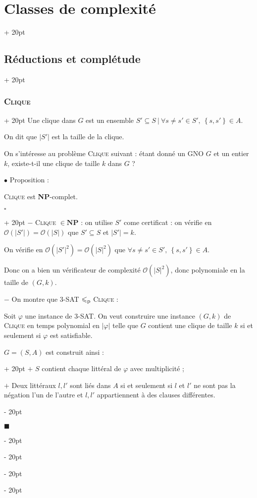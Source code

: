 \documentclass[a4paper, 12pt, twoside]{article}
\newcommand{\lr}[1]{\left( #1 \right)}
\newcommand{\set}[1]{\left\{ #1 \right\}}
\newcommand{\abs}[1]{\left\lvert #1 \right\rvert}
\renewcommand{\le}{\leqslant}
\newcommand{\ind}[1][20pt]{\advance\leftskip + #1}
\newcommand{\deind}[1][20pt]{\advance\leftskip - #1}
\newenvironment{indt}[2][20pt]{#2 \par \ind[#1]}{\par \deind} %
\newenvironment{proof}[1][{}]{\begin{indt}{$\square$ #1}}{$\blacksquare$ \end{indt}}
\begin{document}
\begin{indt}{\section{Classes de complexité}}
\begin{indt}{\subsection{Réductions et complétude}}
\begin{indt}{\subsubsection{\textsc{Clique}}}
                Une clique dans $G$ est un ensemble $S' \subseteq S\ |\ \forall s \neq s' \in S',\ \set{s, s'} \in A$.

                On dit que $\abs{S'}$ est la taille de la clique.

                \vspace{6pt}
                
                On s'intéresse au problème \textsc{Clique} suivant : étant donné un GNO $G$ et un entier $k$, existe-t-il une clique de taille $k$ dans $G$ ?

                \vspace{12pt}
                
                $\bullet$ Proposition :
                \begin{emphBox}
                    \textsc{Clique} est \textbf{NP}-complet.
                \end{emphBox}

                \vspace{6pt}
                
                \begin{proof}
                    $-$ \textsc{Clique} $\in \mathbf{NP}$ : on utilise $S'$ come certificat : on vérifie en $\mathcal O(\abs{S'}) = \mathcal O(\abs S)$ que $S' \subseteq S$ et $\abs{S'} = k$.

                    On vérifie en $\mathcal O\!\lr{\abs{S'}^2} = \mathcal O\!\lr{\abs S ^2}$ que $\forall s \neq s' \in S',\ \set{s, s'} \in A$.

                    Donc on a bien un vérificateur de complexité $\mathcal O\!\lr{\abs S ^2}$, donc polynomiale en la taille de $(G, k)$.

                    \vspace{6pt}
                    
                    $-$ On montre que $3$-SAT $\le_{\rm p}$ \textsc{Clique} :

                    Soit $\varphi$ une instance de 3-SAT. On veut construire une instance $(G, k)$ de \textsc{Clique} en temps polynomial en $\abs \varphi$ telle que $G$ contient une clique de taille $k$ si et seulement si $\varphi$ est satisfiable.

                    \begin{indt}{$G = (S, A)$ est construit ainsi :}
                        $+$ $S$ contient chaque littéral de $\varphi$ avec multiplicité ;

                        $+$ Deux littéraux $l, l'$ sont liés dans $A$ si et seulement si $l$ et $l'$ ne sont pas la négation l'un de l'autre et $l, l'$ appartiennent à des clauses différentes.
                    \end{indt}


\end{proof}
\end{indt}
\end{indt}
\end{indt}
\end{document}
